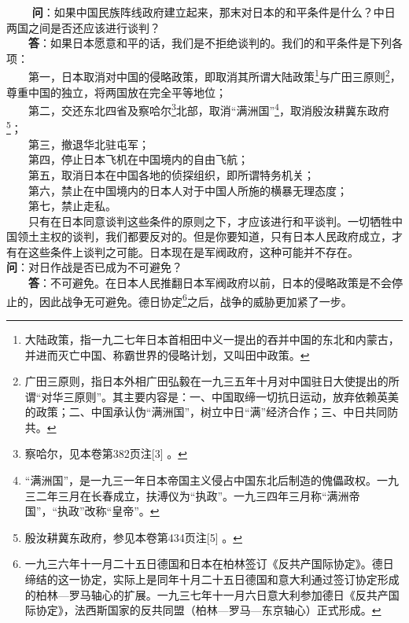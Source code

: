 \documentclass[cn,11pt,chinese]{elegantbook}
\begin{document}
　　
\textbf{问}：如果中国民族阵线政府建立起来，那末对日本的和平条件是什么？中日两国之间是否还应该进行谈判？\\
　　\textbf{答}：如果日本愿意和平的话，我们是不拒绝谈判的。我们的和平条件是下列各项：\\
　　第一，日本取消对中国的侵略政策，即取消其所谓大陆政策\footnote[8]{大陆政策，指一九二七年日本首相田中义一提出的吞并中国的东北和内蒙古，并进而灭亡中国、称霸世界的侵略计划，又叫田中政策。}与广田三原则\footnote[9]{广田三原则，指日本外相广田弘毅在一九三五年十月对中国驻日大使提出的所谓“对华三原则”。其主要内容是：一、中国取缔一切抗日运动，放弃依赖英美的政策；二、中国承认伪“满洲国”，树立中日“满”经济合作；三、中日共同防共。}，尊重中国的独立，将两国放在完全平等地位；\\
　　第二，交还东北四省及察哈尔\footnote[10]{察哈尔，见本卷第382页注[3] 。}北部，取消“满洲国”\footnote[11]{“满洲国”，是一九三一年日本帝国主义侵占中国东北后制造的傀儡政权。一九三二年三月在长春成立，扶溥仪为“执政”。一九三四年三月称“满洲帝国”，“执政”改称“皇帝”。}，取消殷汝耕冀东政府\footnote[12]{殷汝耕冀东政府，参见本卷第434页注[5] 。}；\\
　　第三，撤退华北驻屯军；\\
　　第四，停止日本飞机在中国境内的自由飞航；\\
　　第五，取消日本在中国各地的侦探组织，即所谓特务机关；\\
　　第六，禁止在中国境内的日本人对于中国人所施的横暴无理态度；\\
　　第七，禁止走私。\\

　　只有在日本同意谈判这些条件的原则之下，才应该进行和平谈判。一切牺牲中国领土主权的谈判，我们都要反对的。但是你要知道，只有日本人民政府成立，才有在这些条件上谈判之可能。日本现在是军阀政府，这种可能并不存在。\\

\textbf{问}：对日作战是否已成为不可避免？\\
　　\textbf{答}：不可避免。在日本人民推翻日本军阀政府以前，日本的侵略政策是不会停止的，因此战争无可避免。德日协定\footnote[13]{一九三六年十一月二十五日德国和日本在柏林签订《反共产国际协定》。德日缔结的这一协定，实际上是同年十月二十五日德国和意大利通过签订协定形成的柏林—罗马轴心的扩展。一九三七年十一月六日意大利参加德日《反共产国际协定》，法西斯国家的反共同盟（柏林—罗马—东京轴心）正式形成。}之后，战争的威胁更加紧了一步。\\
\end{document}
